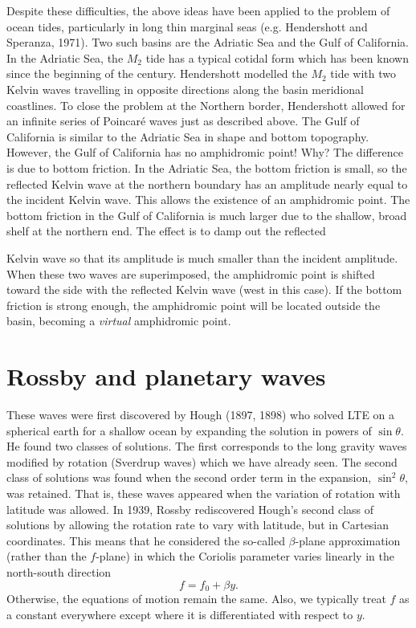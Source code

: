 Despite these difficulties, the above ideas have been applied to the problem of ocean
tides, particularly in long thin marginal seas (e.g. Hendershott and Speranza, 1971).
Two such basins are the Adriatic Sea and the Gulf of California. In the Adriatic Sea,
the $M_2$ tide has a typical cotidal form which has been known since the beginning of
the century. Hendershott modelled the $M_2$ tide with two Kelvin waves travelling in
opposite directions along the basin meridional coastlines. To close the problem at the
Northern border, Hendershott allowed for an infinite series of Poincaré waves just as
described above. The Gulf of California is similar to the Adriatic Sea in shape and
bottom topography. However, the Gulf of California has no amphidromic point! Why?
The difference is due to bottom friction. In the Adriatic Sea, the bottom friction is
small, so the reflected Kelvin wave at the northern boundary has an amplitude nearly
equal to the incident Kelvin wave. This allows the existence of an amphidromic point.
The bottom friction in the Gulf of California is much larger due to the shallow, broad
shelf at the northern end. The effect is to damp out the reflected

\sourcepagebreak

Kelvin wave so that its amplitude is much smaller than the incident amplitude. When
these two waves are superimposed, the amphidromic point is shifted toward the side
with the reflected Kelvin wave (west in this case). If the bottom friction is strong
enough, the amphidromic point will be located outside the basin, becoming a
\emph{virtual} amphidromic point.

\section{Rossby and planetary waves}

These waves were first discovered by Hough (1897, 1898) who solved LTE on a spherical
earth for a shallow ocean by expanding the solution in powers of $\sin\theta$. He found
two classes of solutions. The first corresponds to the long gravity waves modified by
rotation (Sverdrup waves) which we have already seen. The second class of solutions was
found when the second order term in the expansion, $\sin^2\theta$, was retained. That
is, these waves appeared when the variation of rotation with latitude was allowed. In
1939, Rossby rediscovered Hough's second class of solutions by allowing the rotation
rate to vary with latitude, but in Cartesian coordinates. This means that he considered
the so-called $\beta$-plane approximation (rather than the $f$-plane) in which the
Coriolis parameter varies linearly in the north-south direction
\[
	f=f_0+\beta y.
\]
Otherwise, the equations of motion remain the same. Also, we typically treat $f$ as a
constant everywhere except where it is differentiated with respect to $y$.

